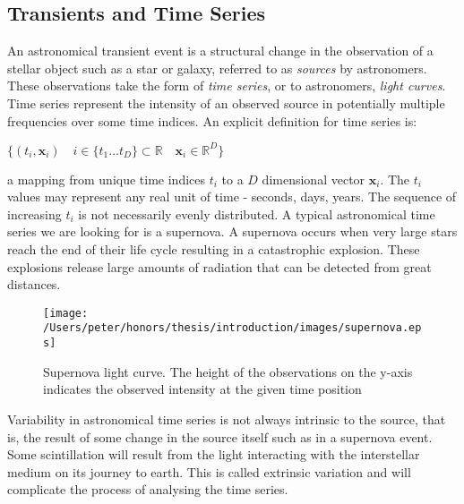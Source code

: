 	\subsection{Transients and Time Series}
	An astronomical transient event is a structural change in the observation of a stellar object such as a star or galaxy, referred to as \emph{sources} by astronomers. These observations take the form of \emph{time series}, or to astronomers, \emph{light curves}. Time series represent the intensity of an observed source in potentially multiple frequencies over some time indices. An explicit definition for time series is:
	\begin{center}
	\begin{math}
		\{(t_i, \mathbf{x}_{i}) \quad i \in \{t_{1} \ldots t_{D}\} \subset \mathbb{R} \quad \mathbf{x}_{i} \in \mathbb{R}^{D} \}
	\end{math}
	\end{center}
	a mapping from unique time indices $t_{i}$ to a $D$ dimensional vector $\mathbf{x}_{i}$. The $t_{i}$ values may represent any real unit of time - seconds, days, years. The sequence of increasing $t_{i}$ is not necessarily evenly distributed. A typical astronomical time series we are looking for is a supernova. A supernova occurs when very large stars reach the end of their life cycle resulting in a catastrophic explosion. These explosions release large amounts of radiation that can be detected from great distances.
	\begin{figure}[ht!]
	\centering
	\texttt{[image: /Users/peter/honors/thesis/introduction/images/supernova.eps]}
	\caption{Supernova light curve. The height of the observations on the y-axis indicates the observed intensity at the given time position}
	\end{figure}
	Variability in astronomical time series is not always intrinsic to the source, that is, the result of some change in the source itself such as in a supernova event. Some scintillation will result from the light interacting with the interstellar medium on its journey to earth. This is called extrinsic variation and will complicate the process of analysing the time series.

